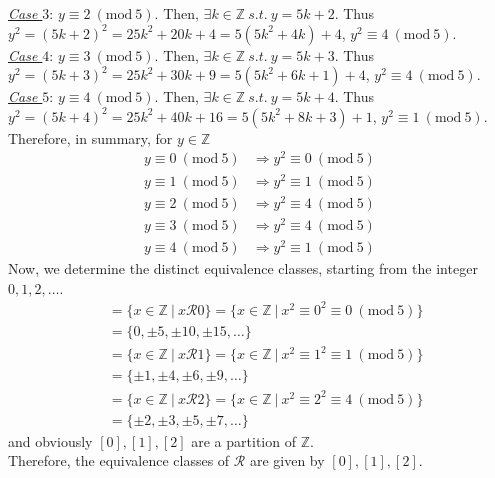 \documentclass[12pt]{article}
\begin{document}
\underline{\textit{Case $3$}}: $y \equiv 2 ~\left(\mathrm{mod}~5\right)$. Then, $\exists k \in \mathbb{Z} ~s.t.~ y = 5k + 2$. Thus $y^2 = \left(5k + 2\right)^2 = 25k^2 + 20k + 4 = 5 \left( 5 k^2 + 4 k \right) + 4$, $y^2 \equiv 4 ~\left(\mathrm{mod}~5\right)$. \\[1em]
\underline{\textit{Case $4$}}: $y \equiv 3 ~\left(\mathrm{mod}~5\right)$. Then, $\exists k \in \mathbb{Z} ~s.t.~ y = 5k + 3$. Thus $y^2 = \left(5k + 3\right)^2 = 25k^2 + 30k + 9 = 5 \left( 5 k^2 + 6 k + 1 \right) + 4$, $y^2 \equiv 4 ~\left(\mathrm{mod}~5\right)$. \\[1em]
\underline{\textit{Case $5$}}: $y \equiv 4 ~\left(\mathrm{mod}~5\right)$. Then, $\exists k \in \mathbb{Z} ~s.t.~ y = 5k + 4$. Thus $y^2 = \left(5k + 4\right)^2 = 25k^2 + 40k + 16 = 5 \left( 5 k^2 + 8 k + 3 \right) + 1$, $y^2 \equiv 1 ~\left(\mathrm{mod}~5\right)$. \\[1em]
Therefore, in summary, for $y \in \mathbb{Z}$
\begin{align*}
y \equiv 0 ~\left(\mathrm{mod}~5\right) &\Rightarrow y^2 \equiv 0 ~\left(\mathrm{mod}~5\right)\\[1em]
y \equiv 1 ~\left(\mathrm{mod}~5\right) &\Rightarrow y^2 \equiv 1 ~\left(\mathrm{mod}~5\right)\\[1em]
y \equiv 2 ~\left(\mathrm{mod}~5\right) &\Rightarrow y^2 \equiv 4 ~\left(\mathrm{mod}~5\right)\\[1em]
y \equiv 3 ~\left(\mathrm{mod}~5\right) &\Rightarrow y^2 \equiv 4 ~\left(\mathrm{mod}~5\right)\\[1em]
y \equiv 4 ~\left(\mathrm{mod}~5\right) &\Rightarrow y^2 \equiv 1 ~\left(\mathrm{mod}~5\right)
\end{align*}
Now, we determine the distinct equivalence classes, starting from the integer $0,1,2,\dots$.
\begin{align*}
[0] &= \{x \in \mathbb{Z} ~|~ x \mathcal{R} 0 \} = \{x \in \mathbb{Z} ~|~ x^2 \equiv 0^2 \equiv 0 ~\left(\mathrm{mod}~5\right)\} \\[1em]
&= \{0, \pm 5, \pm 10, \pm 15, \dots\}
\end{align*}
\begin{align*}
[1] &= \{x \in \mathbb{Z} ~|~ x \mathcal{R} 1 \} = \{x \in \mathbb{Z} ~|~ x^2 \equiv 1^2 \equiv 1 ~\left(\mathrm{mod}~5\right)\} \\[1em]
&= \{ \pm 1, \pm 4, \pm 6, \pm 9, \dots \}
\end{align*}
\begin{align*}
[2] &= \{x \in \mathbb{Z} ~|~ x \mathcal{R} 2 \} = \{x \in \mathbb{Z} ~|~ x^2 \equiv 2^2 \equiv 4 ~\left(\mathrm{mod}~5\right)\} \\[1em]
&= \{ \pm 2, \pm 3, \pm 5, \pm 7, \dots \}
\end{align*}
and obviously $[0], [1], [2]$ are a partition of $\mathbb{Z}$.\\[1em]
Therefore, the equivalence classes of $\mathcal{R}$ are given by $[0], [1], [2]$.
\end{document}
